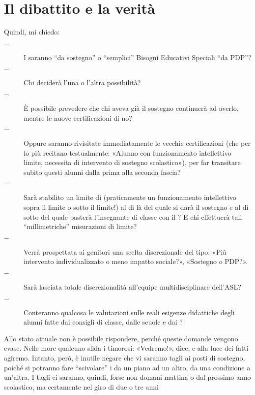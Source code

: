 \section*{Il dibattito e la verità}
Quindi, mi chiedo:
\begin{description}
	\item [$-$]I  saranno “da sostegno” o “semplici” Bisogni Educativi Speciali “da PDP”?
	\item [$-$]Chi deciderà l'una o l'altra possibilità?
	\item [$-$]È possibile prevedere che chi aveva già il sostegno continuerà ad averlo, mentre le nuove certificazioni di  no?
	\item  [$-$]Oppure saranno rivisitate immediatamente le vecchie certificazioni (che per lo più recitano testualmente: «Alunno con funzionamento intellettivo limite, necessita di intervento di sostegno scolastico»), per far transitare subito questi alunni dalla prima alla seconda fascia?
	\item  [$-$]Sarà stabilito un limite di  (praticamente un funzionamento intellettivo sopra il limite o sotto il limite!) al di là del quale si darà il sostegno e al di sotto del quale basterà l'insegnante di classe con il ? E chi effettuerà tali “millimetriche” misurazioni di limite?
	\item  [$-$]Verrà prospettata ai genitori una scelta discrezionale del tipo: «Più intervento individualizzato o meno impatto sociale?», «Sostegno o PDP?».
	\item  [$-$] Sarà lasciata totale discrezionalità all'equipe multidisciplinare dell'ASL?
	\item  [$-$]Conteranno qualcosa le valutazioni sulle reali esigenze didattiche degli alunni fatte dai consigli di classe, dalle scuole e dai  ?
\end{description}
Allo stato attuale non è possibile rispondere, perché queste domande vengono evase. Nelle more qualcuno sfida i timorosi: «Vedremo!», dice, e alla luce dei fatti agiremo. Intanto, però, è inutile negare che vi saranno tagli ai posti di sostegno, poiché si potranno fare “scivolare” i  da un piano ad un altro, da una condizione a un'altra. I tagli ci saranno, quindi, forse non domani mattina o dal prossimo anno scolastico, ma certamente nel giro di due o tre anni
